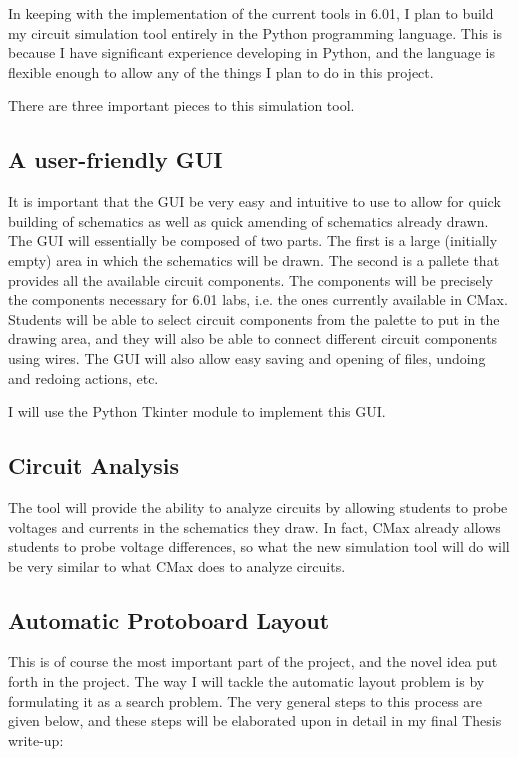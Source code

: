 \documentclass[12pt, doublespacing]{amsart}
\begin{document}
In keeping with the implementation of the current tools in 6.01, I plan to build my circuit simulation tool entirely in the Python programming language. This is because I have significant experience developing in Python, and the language is flexible enough to allow any of the things I plan to do in this project.

There are three important pieces to this simulation tool.

\subsection{A user-friendly GUI}

It is important that the GUI be very easy and intuitive to use to allow for quick building of schematics as well as quick amending of schematics already drawn. The GUI will essentially be composed of two parts. The first is a large (initially empty) area in which the schematics will be drawn. The second is a pallete that provides all the available circuit components. The components will be precisely the components necessary for 6.01 labs, i.e. the ones currently available in CMax. Students will be able to select circuit components from the palette to put in the drawing area, and they will also be able to connect different circuit components using wires. The GUI will also allow easy saving and opening of files, undoing and redoing actions, etc.

I will use the Python Tkinter module to implement this GUI\cite{tkinter}.

\subsection{Circuit Analysis}

The tool will provide the ability to analyze circuits by allowing students to probe voltages and currents in the schematics they draw. In fact, CMax already allows students to probe voltage differences, so what the new simulation tool will do will be very similar to what CMax does to analyze circuits.

\subsection{Automatic Protoboard Layout}

This is of course the most important part of the project, and the novel idea put forth in the project. The way I will tackle the automatic layout problem is by formulating it as a search problem. The very general steps to this process are given below, and these steps will be elaborated upon in detail in my final Thesis write-up:
\end{document}
